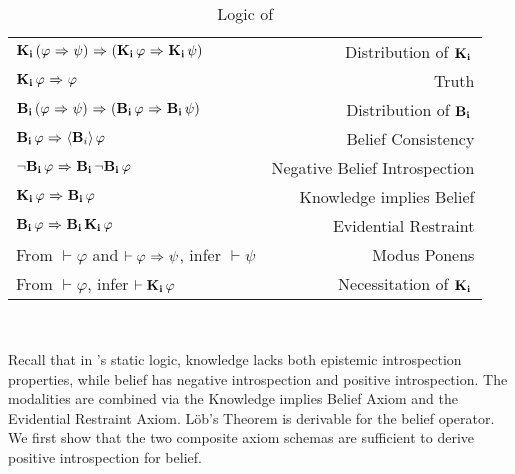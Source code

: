 \subsection{\DASL}
\label{sec:crap}

\begin{table}[H]
	\begin{center}
		\begin{tabular}{| l r |}
			\hline
			$\mathbf{K}_{\mathbf{i}}\,(\varphi {\ \Rightarrow \ } \psi) {\ \Rightarrow \ } (\mathbf{K}_{\mathbf{i}}\,\varphi {\ \Rightarrow \ } \mathbf{K}_{\mathbf{i}}\,\psi)$ & Distribution of $\mathbf{K}_{\mathbf{i}}\,$ \\
			$\mathbf{K}_{\mathbf{i}}\,\varphi {\ \Rightarrow \ } \varphi$ & Truth \\
			$\mathbf{B}_{\mathbf{i}}\,(\varphi {\ \Rightarrow \ } \psi) {\ \Rightarrow \ } (\mathbf{B}_{\mathbf{i}}\,\varphi {\ \Rightarrow \ } \mathbf{B}_{\mathbf{i}}\,\psi)$ & Distribution of $\mathbf{B}_{\mathbf{i}}\,$\\
			$\mathbf{B}_{\mathbf{i}}\,\varphi {\ \Rightarrow \ } \langle \mathbf{B}_{i} \rangle\,\varphi$ & Belief Consistency \\
			${\neg}\mathbf{B}_{\mathbf{i}}\,\varphi {\ \Rightarrow \ } \mathbf{B}_{\mathbf{i}}\,{\neg}\mathbf{B}_{\mathbf{i}}\,\varphi$ & Negative Belief Introspection\\
			$\mathbf{K}_{\mathbf{i}}\,\varphi {\ \Rightarrow \ } \mathbf{B}_{\mathbf{i}}\,\varphi$ & Knowledge implies Belief \\
			$\mathbf{B}_{\mathbf{i}}\,\varphi {\ \Rightarrow \ } \mathbf{B}_{\mathbf{i}}\,\mathbf{K}_{\mathbf{i}}\,\varphi$ & Evidential Restraint\\
			From $\vdash \varphi$ and $\vdash \varphi {\ \Rightarrow \ } \psi$, infer $\vdash\psi$ & Modus Ponens\\
			From $\vdash \varphi$, infer $\vdash \mathbf{K}_{\mathbf{i}}\,\varphi$ & Necessitation of $\mathbf{K}_{\mathbf{i}}\,$\\
			\hline
		\end{tabular}
		\caption{Logic of \DASL}~\label{DASL-static}
	\end{center}
\end{table}

Recall that in \DASL's static logic, knowledge lacks both epistemic introspection properties, while belief has negative introspection and positive introspection. The modalities are combined via the Knowledge implies Belief Axiom and the Evidential Restraint Axiom. L\"ob's Theorem is derivable for the belief operator. We first show that the two composite axiom schemas are sufficient to derive positive introspection for belief.

